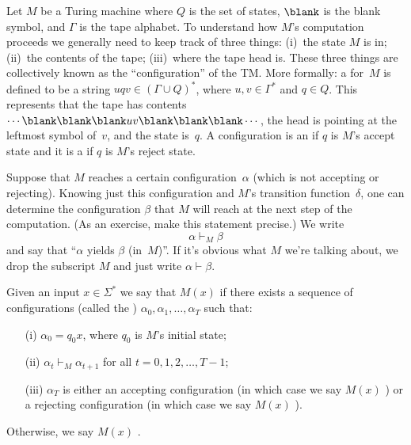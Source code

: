 \begin{definition}
\label{definition:A-TM-accepting-or-rejecting-a-string} 
Let $M$ be a Turing machine where $Q$ is the set of states, $\blank$ is the blank symbol, and $\Gamma$ is the tape alphabet. To understand how $M$'s computation proceeds we generally need to keep track of three things: (i)~the state $M$ is in; (ii)~the contents of the tape; (iii)~where the tape head is.  These three things are collectively known as the ``configuration'' of the TM.  More formally: a  for~$M$ is defined to be a string $uqv \in (\Gamma \cup Q)^*$, where $u, v \in \Gamma^*$ and $q \in Q$. This represents that the tape has contents $\cdots \blank \blank \blank uv \blank \blank \blank \cdots$, the head is pointing at the leftmost symbol of~$v$, and the state is~$q$. A configuration is an  if $q$ is $M$'s accept state and it is a  if $q$ is $M$'s reject state.

Suppose that $M$ reaches a certain configuration~$\alpha$ (which is not accepting or rejecting). Knowing just this configuration and $M$'s transition function~$\delta$, one can determine the configuration $\beta$ that $M$ will reach at the next step of the computation. (As an exercise, make this statement precise.)  We write
\[
    \alpha \vdash_M \beta
\]
and say that ``$\alpha$ yields $\beta$ (in~$M$)''.  If it's obvious what $M$ we're talking about, we drop the subscript $M$ and just write $\alpha \vdash \beta$. 

Given an input $x \in \Sigma^*$ we say that $M(x)$  if there exists a sequence of configurations (called the ) $\alpha_0, \alpha_1, \dots, \alpha_{T}$ such that:

\begin{enumerate}
    \item[(i)] $\alpha_0 = q_0x$, where $q_0$ is $M$'s initial state;
    \item[(ii)] $\alpha_t \vdash_M \alpha_{t+1}$ for all $t = 0, 1, 2, \dots, T-1$;
    \item[(iii)] $\alpha_T$ is either an accepting configuration (in which case we say $M(x)$ ) or a rejecting configuration (in which case we say $M(x)$ ).
\end{enumerate}
Otherwise, we say $M(x)$ .

\end{definition}

